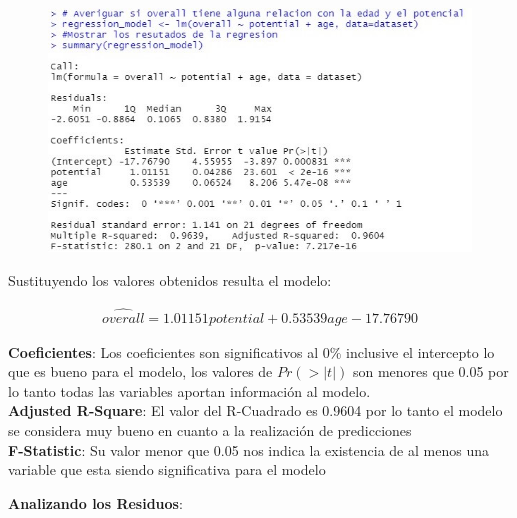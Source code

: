 \documentclass[a4paper,10pt,twocolumn]{article}
\begin{document}
\begin{figure}[h]
	\includegraphics[scale=0.7]{./imgs/reg_model.jpg}
\end{figure}

Sustituyendo los valores obtenidos resulta el modelo:

\begin{align*}
\widehat{overall} = 1.01151 potential + 0.53539 age - 17.76790
\end{align*}

\textbf{Coeficientes}: Los coeficientes son significativos al $0\%$ inclusive el intercepto lo que es bueno para el modelo, los valores de $Pr(>|t|)$ son menores que 0.05 por lo tanto todas las variables aportan información al modelo.\\

\textbf{Adjusted R-Square}: El valor del R-Cuadrado es 0.9604 por lo tanto el modelo se considera muy bueno en cuanto a la realizaci\'on de predicciones\\

\textbf{F-Statistic}: Su valor menor que 0.05 nos indica la existencia de al menos una variable que esta siendo significativa para el modelo

\newpage

\textbf{Analizando los Residuos}:
\end{document}
